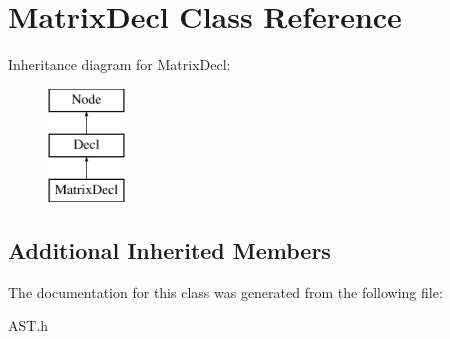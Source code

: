 \hypertarget{classMatrixDecl}{\section{Matrix\-Decl Class Reference}
\label{classMatrixDecl}
}
Inheritance diagram for Matrix\-Decl\-:\begin{figure}[H]
\begin{center}
\leavevmode
\includegraphics[height=3.000000cm]{classMatrixDecl}
\end{center}
\end{figure}
\subsection*{Additional Inherited Members}


The documentation for this class was generated from the following file\-:\begin{DoxyCompactItemize}
\item 
A\-S\-T.\-h\end{DoxyCompactItemize}
